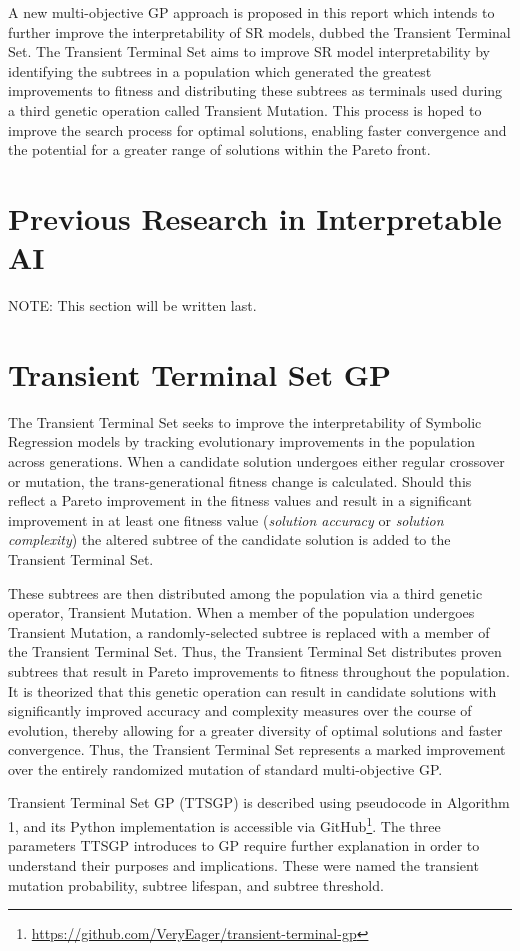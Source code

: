 \documentclass[a4paper, twocolumn]{article}
\begin{document}
A new multi-objective GP approach is proposed in this report which intends to further improve the interpretability of SR models, dubbed the Transient Terminal Set. The Transient Terminal Set aims to improve SR model interpretability by identifying the subtrees in a population which generated the greatest improvements to fitness and distributing these subtrees as terminals used during a third genetic operation called Transient Mutation. This process is hoped to improve the search process for optimal solutions, enabling faster convergence and the potential for a greater range of solutions within the Pareto front.

\section{Previous Research in Interpretable AI}
NOTE: This section will be written last.

\section{Transient Terminal Set GP}
The Transient Terminal Set seeks to improve the interpretability of Symbolic Regression models by tracking evolutionary improvements in the population across generations. When a candidate solution undergoes either regular crossover or mutation, the trans-generational fitness change is calculated. Should this reflect a Pareto improvement in the fitness values and result in a significant improvement in at least one fitness value (\textit{solution accuracy} or \textit{solution complexity}) the altered subtree of the candidate solution is added to the Transient Terminal Set.

These subtrees are then distributed among the population via a third genetic operator, Transient Mutation. When a member of the population undergoes Transient Mutation, a randomly-selected subtree is replaced with a member of the Transient Terminal Set. Thus, the Transient Terminal Set distributes proven subtrees that result in Pareto improvements to fitness throughout the population. It is theorized that this genetic operation can result in candidate solutions with significantly improved accuracy and complexity measures over the course of evolution, thereby allowing for a greater diversity of optimal solutions and faster convergence. Thus, the Transient Terminal Set represents a marked improvement over the entirely randomized mutation of standard multi-objective GP. 

Transient Terminal Set GP (TTSGP) is described using pseudocode in Algorithm 1, and its Python implementation is accessible via GitHub\footnote[1]{\url{https://github.com/VeryEager/transient-terminal-gp}}. The three parameters TTSGP introduces to GP require further explanation in order to understand their purposes and implications. These were named the transient mutation probability, subtree lifespan, and subtree threshold.
\end{document}

